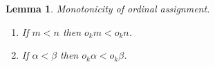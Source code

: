 \documentclass{amsart}
\theoremstyle{plain}
\theoremstyle{plain}
\newtheorem{lemma}[theorem]{Lemma}
\newcommand\OT{\mathsf{OT}}
\newcommand{\okpe}{o_{k+1}}
\newcommand{\ok}{o_{k}}
\newcommand{\al}{{\alpha}}
\begin{document}

\begin{lemma} \label{lm:OkMon} Monotonicity  of ordinal assignment. %
\begin{enumerate}
    \item If $m<n$ then $\ok m < \ok n$. 
    \item If $\alpha<\beta$ then $\ok \alpha<\ok \beta$.
\end{enumerate}
\end{lemma}
\end{document}

